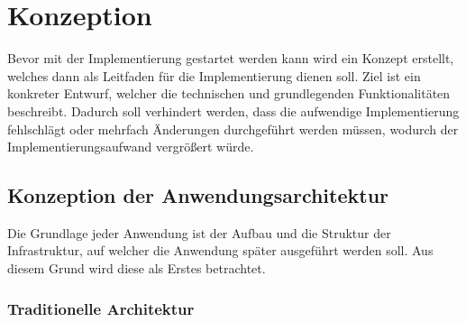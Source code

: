 \chapter{Konzeption}\label{cha:konzeption}
Bevor mit der Implementierung gestartet werden kann wird ein Konzept erstellt, welches dann als Leitfaden für die Implementierung dienen soll.
Ziel ist ein konkreter Entwurf, welcher die technischen und grundlegenden Funktionalitäten beschreibt.
Dadurch soll verhindert werden, dass die aufwendige Implementierung fehlschlägt oder mehrfach Änderungen durchgeführt werden müssen, wodurch der Implementierungsaufwand vergrößert würde.


















\section{Konzeption der Anwendungsarchitektur}
Die Grundlage jeder Anwendung ist der Aufbau und die Struktur der Infrastruktur, auf welcher die Anwendung später ausgeführt werden soll.
Aus diesem Grund wird diese als Erstes betrachtet.

\subsection{Traditionelle Architektur}

